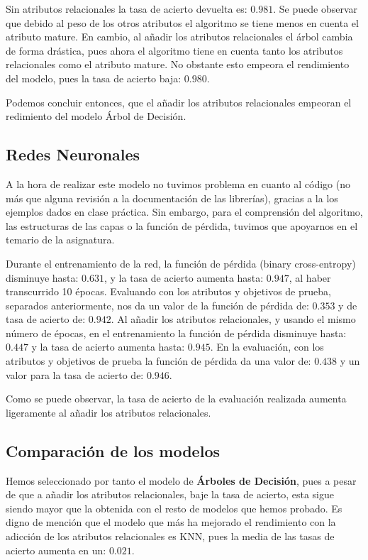 \documentclass[conference,a4paper]{IEEEtran}
\begin{document}
Sin atributos relacionales la tasa de acierto devuelta es: $0.981$. Se puede observar que debido al peso de los otros atributos el algoritmo se tiene menos en cuenta el atributo mature. En cambio, al añadir los atributos relacionales el árbol cambia de forma drástica, pues ahora el algoritmo tiene en cuenta tanto los atributos relacionales como el atributo mature. No obstante esto empeora el rendimiento del modelo, pues la tasa de acierto baja: $0.980$.

 Podemos concluir entonces, que el añadir los atributos relacionales empeoran el redimiento del modelo Árbol de Decisión.

\subsection{Redes Neuronales}

A la hora de realizar este modelo no tuvimos problema en cuanto al código (no más que alguna revisión a la documentación de las librerías), gracias a la los ejemplos dados en clase práctica. Sin embargo, para el comprensión del algoritmo, las estructuras de las capas o la función de pérdida, tuvimos que apoyarnos en el temario de la asignatura.

Durante el entrenamiento de la red, la función de pérdida (binary cross-entropy) disminuye hasta: $0.631$, y la tasa de acierto aumenta hasta: $0.947$, al haber transcurrido 10 épocas. Evaluando con los atributos y objetivos de prueba, separados anteriormente, nos da un valor de la función de pérdida de: $0.353$ y de tasa de acierto de: $0.942$. Al añadir los atributos relacionales, y usando el mismo número de épocas, en el entrenamiento la función de pérdida disminuye hasta: $0.447$ y la tasa de acierto aumenta hasta: $0.945$. En la evaluación, con los atributos y objetivos de prueba la función de pérdida da una valor de: $0.438$ y un valor para la tasa de acierto de: $0.946$.  

Como se puede observar, la tasa de acierto de la evaluación realizada aumenta ligeramente al añadir los atributos relacionales.

\subsection{Comparación de los modelos}

Hemos seleccionado por tanto el modelo de \textbf{Árboles de Decisión}, pues a pesar de que a añadir los atributos relacionales, baje la tasa de acierto, esta sigue siendo mayor que la obtenida con el resto de modelos que hemos probado. Es digno de mención que el modelo que más ha mejorado el rendimiento con la adicción de los atributos relacionales es KNN, pues la media de las tasas de acierto aumenta en un: $0.021$.
\end{document}
